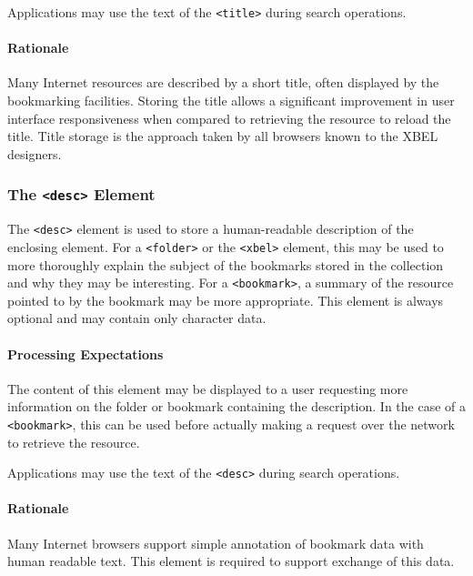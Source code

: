 \documentclass{howto}
\newcommand{\element}[1]{\texttt{<#1>}}
\begin{document}
        Applications may use the text of the \element{title}
        during search operations.

      \paragraph*{Rationale}
        Many Internet resources are described by a short title, often
        displayed by the bookmarking facilities.  Storing the title
        allows a significant improvement in user interface
        responsiveness when compared to retrieving the resource to
        reload the title.  Title storage is the approach taken by all
        browsers known to the XBEL designers.

    \subsubsection{The \element{desc} Element
                   \label{element-desc}}

      The \element{desc} element is used to store a human-readable
      description of the enclosing element.  For a \element{folder} or 
      the \element{xbel} element,
      this may be used to more thoroughly explain the subject of the
      bookmarks stored in the collection and why they may be
      interesting.  For a \element{bookmark}, a summary of the
      resource pointed to by the bookmark may be more appropriate.
      This element is always optional and may contain only character
      data.

      \paragraph*{Processing Expectations}
        The content of this element may be displayed to a user
        requesting more information on the folder or bookmark
        containing the description.  In the case of a
        \element{bookmark}, this can be used before actually making a
        request over the network to retrieve the resource.

        Applications may use the text of the \element{desc}
        during search operations.

      \paragraph*{Rationale}
        Many Internet browsers support simple annotation of bookmark
        data with human readable text.  This element is required to
        support exchange of this data.
\end{document}

